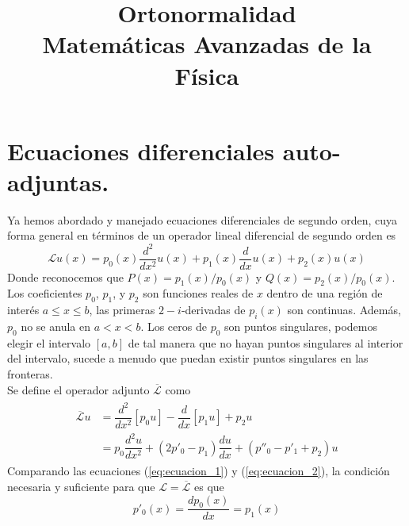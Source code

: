 
\usepackage{mathrsfs}
\title{Ortonormalidad \\ {\large Matemáticas Avanzadas de la Física}}
\date{ }

\renewcommand\labelenumii{\theenumi.{\arabic{enumii}}}
\maketitle
\fontsize{14}{14}\selectfont
\section{Ecuaciones diferenciales auto-adjuntas.}
Ya hemos abordado y manejado ecuaciones diferenciales de segundo orden, cuya forma general en términos de un operador lineal diferencial de segundo orden es
\begin{equation}
\mathscr{L} u(x) = p_{0}(x) \dfrac{d^{2}}{d x^{2}} u(x) + p_{1}(x) \dfrac{d}{dx} u(x) + p_{2}(x) u(x)
\label{eq:ecuacion_1}
\end{equation}
Donde reconocemos que $P(x) = p_{1}(x)/p_{0}(x)$ y $Q(x)= p_{2}(x)/p_{0}(x)$.
\\
Los coeficientes $p_{0}$, $p_{1}$, y $p_{2}$ son funciones reales de $x$ dentro de una región de interés $a \leq x \leq b$, las primeras $2-i$-derivadas de $p_{i}(x)$ son continuas. Además, $p_{0}$ no se anula en $a<x<b$. Los ceros de $p_{0}$ son puntos singulares, podemos elegir el intervalo $[a,b]$ de tal manera que no hayan puntos singulares al interior del intervalo, sucede a menudo que puedan existir puntos singulares en las fronteras.
\\
Se define el operador adjunto $\overline{\mathscr{L}}$ como
\begin{eqnarray}
\begin{aligned}
\overline{\mathscr{L}} u &= \dfrac{d^{2}}{d x^{2}}[ p_{0} u] - \dfrac{d}{dx} [p_{1} u] + p_{2} u \\
&= p_{0}\dfrac{d^{2} u}{d x^{2}} + (2 p'_{0} - p_{1}) \dfrac{du}{dx} + (p''_{0} - p'_{1} + p_{2}) u
\label{eq:ecuacion_2}
\end{aligned}
\end{eqnarray}
Comparando las ecuaciones (\ref{eq:ecuacion_1}) y (\ref{eq:ecuacion_2}), la condición necesaria y suficiente para que $\mathscr{L} = \overline{\mathscr{L}}$ es que
\begin{equation}
p'_{0}(x) = \dfrac{d p_{0}(x)}{dx} = p_{1}(x) \label{eq:ecuacion_3}
\end{equation}
